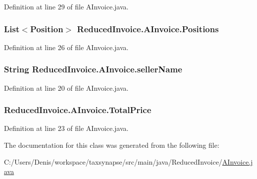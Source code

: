 Definition at line 29 of file A\+Invoice.\+java.

\subsubsection[{\texorpdfstring{Positions}{Positions}}]{\setlength{\rightskip}{0pt plus 5cm}List$<${\bf Position}$>$ Reduced\+Invoice.\+A\+Invoice.\+Positions\hspace{0.3cm}{\ttfamily [protected]}}\hypertarget{class_reduced_invoice_1_1_a_invoice_a5b51f1865386bd021580507c7133f69a}{}\label{class_reduced_invoice_1_1_a_invoice_a5b51f1865386bd021580507c7133f69a}


Definition at line 26 of file A\+Invoice.\+java.

\subsubsection[{\texorpdfstring{seller\+Name}{sellerName}}]{\setlength{\rightskip}{0pt plus 5cm}String Reduced\+Invoice.\+A\+Invoice.\+seller\+Name\hspace{0.3cm}{\ttfamily [protected]}}\hypertarget{class_reduced_invoice_1_1_a_invoice_ae00a97e1c74841fe0b0b43fccd1da24d}{}\label{class_reduced_invoice_1_1_a_invoice_ae00a97e1c74841fe0b0b43fccd1da24d}


Definition at line 20 of file A\+Invoice.\+java.

\subsubsection[{\texorpdfstring{Total\+Price}{TotalPrice}}]{ Reduced\+Invoice.\+A\+Invoice.\+Total\+Price\hspace{0.3cm}{\ttfamily [protected]}}\hypertarget{class_reduced_invoice_1_1_a_invoice_a72b831e7ee0b4501fc949f61aecdd498}{}\label{class_reduced_invoice_1_1_a_invoice_a72b831e7ee0b4501fc949f61aecdd498}


Definition at line 23 of file A\+Invoice.\+java.



The documentation for this class was generated from the following file\+:\begin{DoxyCompactItemize}
\item 
C\+:/\+Users/\+Denis/workspace/taxsynapse/src/main/java/\+Reduced\+Invoice/\hyperlink{_a_invoice_8java}{A\+Invoice.\+java}\end{DoxyCompactItemize}
